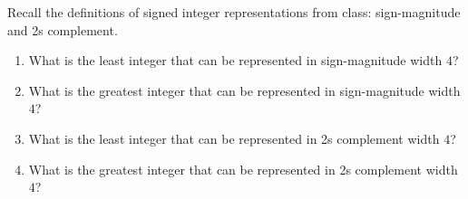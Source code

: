 
Recall the definitions of signed integer representations from class: 
sign-magnitude and 2s complement.

\begin{enumerate}
   \item What is the least integer that can be represented in sign-magnitude 
   width $4$?
   \item What is the greatest integer that  can be represented in sign-magnitude 
   width $4$?
   \item What is the least integer that can be represented in 2s complement
   width $4$?
   \item What is the greatest integer that  can be represented in 2s complement
   width $4$?
\end{enumerate}
